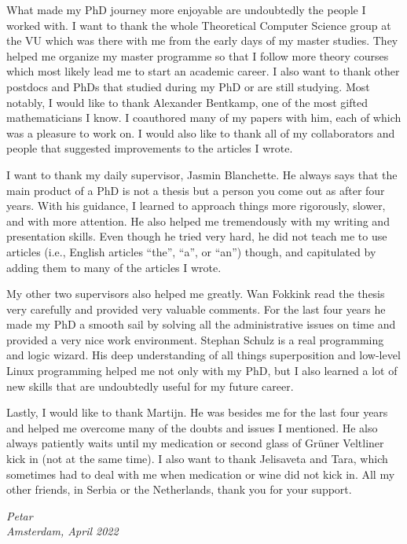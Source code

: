 What made my PhD journey more enjoyable are undoubtedly the people I worked
with. I want to thank the whole Theoretical Computer Science group at the VU
which was there with me from the early days of my master studies. They helped me
organize my master programme so that I follow more theory courses which most
likely lead  me to start an academic career. I also want to thank other postdocs
and PhDs that studied during my PhD or are still studying. Most notably, I would
like to thank Alexander Bentkamp, one of the most gifted mathematicians I know.
I coauthored many of my papers with him, each of which was a pleasure to work
on. I would also like to thank all of my collaborators and people that suggested
improvements to the articles I wrote.

I want to thank my daily supervisor, Jasmin Blanchette. He always says that the
main product of a PhD is not a thesis but a person you come out as after four
years. With his guidance, I learned to approach things more rigorously, slower,
and with more attention. He also helped me tremendously  with my writing and
presentation skills. Even though he tried very hard, he did not teach me to use
articles (i.e., English articles ``the'', ``a'', or ``an'') though, and
capitulated by adding them to many of the articles I wrote.

My other two supervisors also helped me greatly. Wan Fokkink read the thesis
very carefully and provided very valuable comments. For the last four years he
made my PhD a smooth sail by solving all the administrative issues on time and
provided a very nice work environment. Stephan Schulz is a real programming and
logic wizard. His deep understanding of all things superposition and low-level
Linux programming helped me not only with my PhD, but I also learned a lot of
new skills that are undoubtedly useful for my future career.

Lastly, I would like to thank Martijn. He was besides me for the last four years
and helped me overcome many of the doubts and issues I mentioned. He also always
patiently waits until my medication or second glass of Grüner Veltliner kick in
(not at the same time). I also want to thank Jelisaveta and Tara, which
sometimes had to deal with me when medication or wine did not kick in. All my other friends,
in Serbia or the Netherlands, thank you for your support.

 

\begin{flushright}
{\makeatletter\itshape
    Petar \\
    Amsterdam, April 2022
\makeatother}
\end{flushright}



